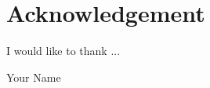 \justifying

\chapter*{Acknowledgement}

I would like to thank ...

\begin{flushright}
Your Name
\end{flushright}

